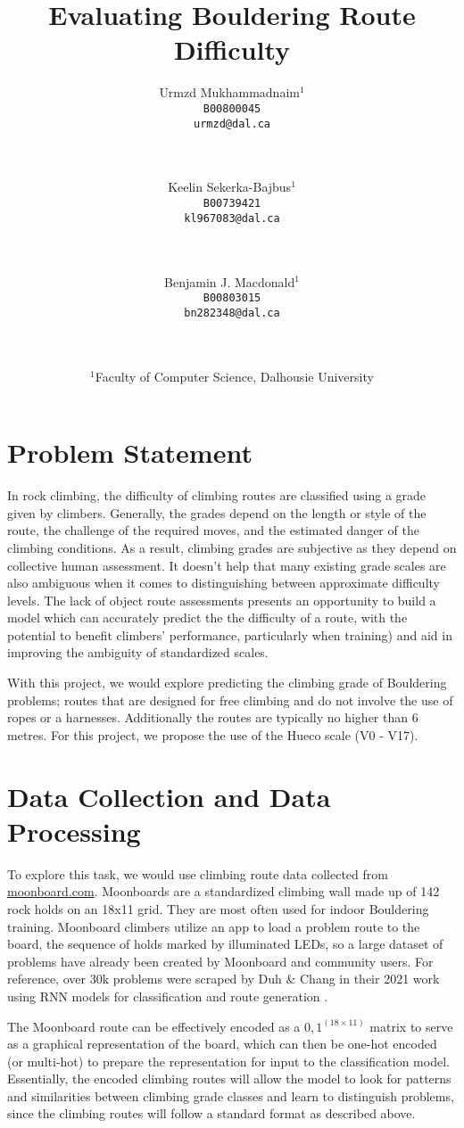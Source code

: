 \documentclass[10pt]{article}
\title{Evaluating Bouldering Route Difficulty}
\author{ Urmzd
  Mukhammadnaim$^1$\\ \texttt{B00800045} \\ \texttt{urmzd@dal.ca} \\ \\ \\ 
  \and
  Keelin Sekerka-Bajbus$^1$\\ \texttt{B00739421}\\ \texttt{kl967083@dal.ca}\\
  \\ \\ 
  \and Benjamin J. Macdonald$^1$\\ \texttt{B00803015}\\
\texttt{bn282348@dal.ca}\\ \\ \\ }
\date{$^1$Faculty of Computer Science, Dalhousie University}
\begin{document}
 \maketitle

\section{Problem Statement}
In rock climbing, the difficulty of climbing routes
are classified using a grade given by climbers. Generally, the grades depend on the
length or style of the route, the challenge of the required moves, and the
estimated danger of the climbing conditions. As a result, climbing grades are
subjective as they depend on collective human assessment. It doesn't help that many 
existing grade scales are also ambiguous when it comes to 
distinguishing between approximate difficulty levels. 
The lack of object route assessments presents an opportunity to build a model which can accurately predict the 
the difficulty of a route, with the potential 
to benefit climbers' performance, particularly when training) and aid in
improving the ambiguity of standardized scales.

With this project, we would explore predicting the climbing grade of Bouldering
problems; routes that are designed for free climbing and do not involve the use 
of ropes or a harnesses. Additionally the routes are typically no higher than 6 metres.
For this project, we propose the use of the Hueco scale (V0 - V17).

\section{Data Collection and Data Processing}

To explore this task, we would use climbing route data collected from 
\href{https://www.moonboard.com/}{moonboard.com}. Moonboards are a standardized climbing wall
made up of 142 rock holds on an 18x11 grid. They are most often used for indoor Bouldering
training. Moonboard climbers utilize an app to load a problem route to the
board, the sequence of holds marked by illuminated LEDs, so a large dataset of
problems have already been created by Moonboard and community users. For reference, over 30k problems
were scraped by Duh \& Chang in their 2021 work using RNN models for
classification and route generation \cite{DBLP:journals/corr/abs-2102-01788}.

The Moonboard route can be effectively encoded as a ${0, 1}^(18 \times 11)$ matrix to
serve as a graphical representation of the board, which can then be one-hot
encoded (or multi-hot) to prepare the representation for input to the classification 
model. Essentially, the encoded climbing routes will allow the model 
to look for patterns and similarities between climbing grade classes and learn
to distinguish problems, since the climbing routes
will follow a standard format as described above.
\end{document}
